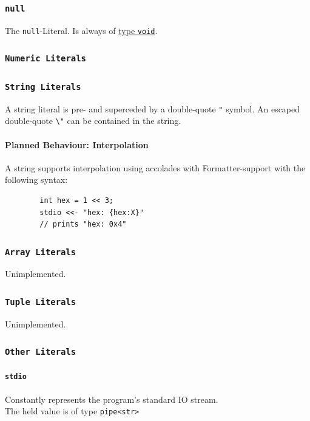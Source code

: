 \documentclass{docs}
\begin{document}
    \subsubsection{\texttt{null}}
    The \texttt{null}-Literal. Is always of \hyperref[typeVoid]{type \texttt{void}}.
    \subsubsection{\texttt{Numeric Literals}}
    \subsubsection{\texttt{String Literals}}
    A string literal is pre- and superceded by a double-quote \texttt{"} symbol.
    An escaped double-quote \texttt{\textbackslash"} can be contained in the string.
    \paragraph{Planned Behaviour: Interpolation}
    A string supports interpolation using accolades with Formatter-support with the following syntax:
    \begin{verbatim}
        int hex = 1 << 3;
        stdio <<- "hex: {hex:X}"
        // prints "hex: 0x4"
    \end{verbatim}
    \subsubsection{\texttt{Array Literals}}
    Unimplemented.
    \subsubsection{\texttt{Tuple Literals}}
    Unimplemented.
    \subsubsection{\texttt{Other Literals}}
    \paragraph{\texttt{stdio}}
    Constantly represents the program's standard IO stream. \\
    The held value is of type \texttt{pipe<str>}
\end{document}
